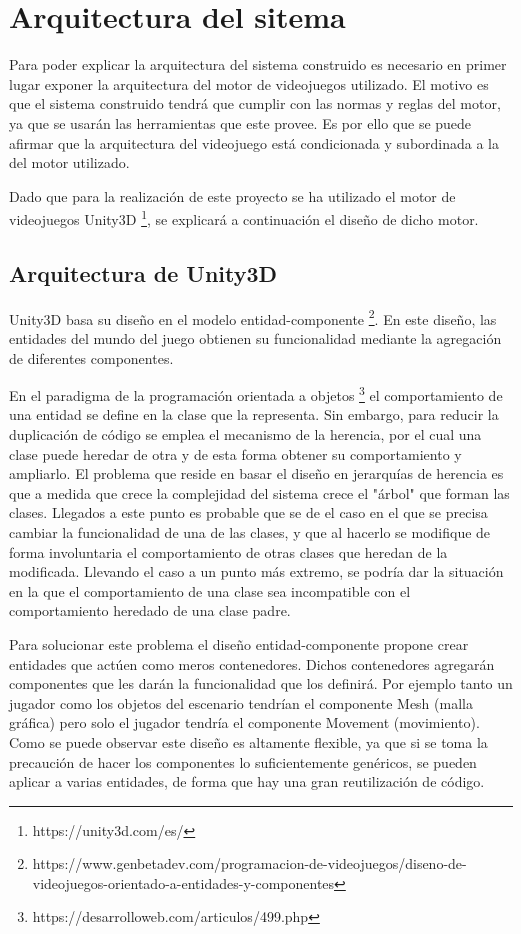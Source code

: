 \section{Arquitectura del sitema}

Para poder explicar la arquitectura del sistema construido es necesario en primer lugar exponer la arquitectura del motor de videojuegos utilizado. El motivo es que el sistema construido tendrá que cumplir con las normas y reglas del motor, ya que se usarán las herramientas que este provee. Es por ello que se puede afirmar que la arquitectura del videojuego está condicionada y subordinada a la del motor utilizado.

Dado que para la realización de este proyecto se ha utilizado el motor de videojuegos Unity3D \footnote{https://unity3d.com/es/}, se explicará a continuación el diseño de dicho motor.

\subsection{Arquitectura de Unity3D}

Unity3D basa su diseño en el modelo entidad-componente \footnote{https://www.genbetadev.com/programacion-de-videojuegos/diseno-de-videojuegos-orientado-a-entidades-y-componentes}. En este diseño, las entidades del mundo del juego obtienen su funcionalidad mediante la agregación de diferentes componentes. 

En el paradigma de la programación orientada a objetos \footnote{https://desarrolloweb.com/articulos/499.php} el comportamiento de una entidad se define en la clase que la representa. Sin embargo, para reducir la duplicación de código se emplea el mecanismo de la herencia, por el cual una clase puede heredar de otra y de esta forma obtener su comportamiento y ampliarlo. 
El problema que reside en basar el diseño en jerarquías de herencia es que a medida que crece la complejidad del sistema crece el "árbol" que forman las clases. Llegados a este punto es probable que se de el caso en el que se precisa cambiar la funcionalidad de una de las clases, y que al hacerlo se modifique de forma involuntaria el comportamiento de otras clases que heredan de la modificada. Llevando el caso a un punto más extremo, se podría dar la situación en la que el comportamiento de una clase sea incompatible con el comportamiento heredado de una clase padre.

Para solucionar este problema el diseño entidad-componente propone crear entidades que actúen como meros contenedores. Dichos contenedores agregarán componentes que les darán la funcionalidad que los definirá. Por ejemplo tanto un jugador como los objetos del escenario tendrían el componente Mesh (malla gráfica) pero solo el jugador tendría el componente Movement (movimiento). Como se puede observar este diseño es altamente flexible, ya que si se toma la precaución de hacer los componentes lo suficientemente genéricos, se pueden aplicar a varias entidades, de forma que hay una gran reutilización de código. 

